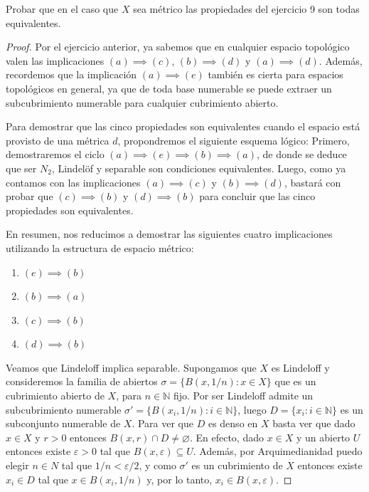 \documentclass{article}
\theoremstyle{definition}
\newcommand{\N}{\mathbb{N}}
\newenvironment{ejercicio}[1]{\begin{trivlist}
\item[\hskip \labelsep {\bfseries Ejercicio}\hskip \labelsep {\bfseries #1.}]}{\end{trivlist}}
\begin{document}
\begin{ejercicio}{10}
    Probar que en el caso que \(X\) sea métrico las propiedades del ejercicio 9 son todas equivalentes.
\end{ejercicio}
\begin{proof}
    Por el ejercicio anterior, ya sabemos que en cualquier espacio topológico valen las implicaciones \((a) \implies (c)\), \((b) \implies (d)\) y \((a) \implies (d)\). Además, recordemos que la implicación \((a) \implies (e)\) también es cierta para espacios topológicos en general, ya que de toda base numerable se puede extraer un subcubrimiento numerable para cualquier cubrimiento abierto.

    Para demostrar que las cinco propiedades son equivalentes cuando el espacio está provisto de una métrica \(d\), propondremos el siguiente esquema lógico:
    Primero, demostraremos el ciclo \((a) \implies (e) \implies (b) \implies (a)\), de donde se deduce que ser \(N_2\), Lindelöf y separable son condiciones equivalentes.
    Luego, como ya contamos con las implicaciones \((a) \implies (c)\) y \((b) \implies (d)\), bastará con probar que \((c) \implies (b)\) y \((d) \implies (b)\) para concluir que las cinco propiedades son equivalentes.

    En resumen, nos reducimos a demostrar las siguientes cuatro implicaciones utilizando la estructura de espacio métrico:
    \begin{enumerate}
        \item \((e) \implies (b)\)
        \item \((b) \implies (a)\)
        \item \((c) \implies (b)\)
        \item \((d) \implies (b)\)
    \end{enumerate}

    Veamos que Lindeloff implica separable. Supongamos que \( X \) es Lindeloff y consideremos la familia de abiertos \( \sigma = \{ B(x, 1/n) : x \in X \} \) que es un cubrimiento abierto de \( X \), para \( n \in \N \) fijo.
    Por ser Lindeloff admite un subcubrimiento numerable \( \sigma' = \{ B(x_i, 1/n) : i \in \N \} \), luego \( D = \{ x_i : i \in \N \} \) es un subconjunto numerable de \( X \).
    Para ver que \( D \) es denso en \( X \) basta ver que dado \( x \in X \) y \( r > 0 \) entonces \( B(x, r) \cap D \neq \varnothing \). En efecto,
    dado \( x \in X \) y un abierto \( U \) entonces existe \( \varepsilon > 0 \) tal que \( B(x, \varepsilon) \subseteq U \). Además, por Arquimedianidad puedo elegir \( n \in N \) tal que \( 1/n < \varepsilon/2 \),
    y como \( \sigma' \) es un cubrimiento de \( X \) entonces existe \( x_i \in D \) tal que \( x \in B(x_i, 1/n) \) y, por lo tanto, \( x_i \in B(x, \varepsilon) \).


\end{proof}
\end{document}
